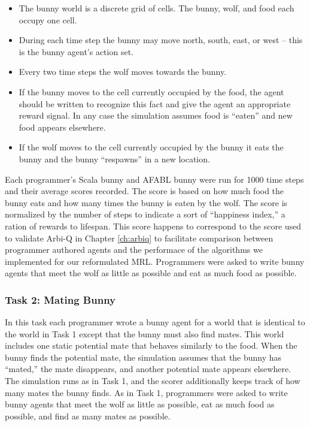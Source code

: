 \begin{itemize}

\item The bunny world is a discrete grid of cells.  The bunny, wolf, and food each occupy one cell.

\item During each time step the bunny may move north, south, east, or west -- this is the bunny agent's action set.

\item Every two time steps the wolf moves towards the bunny.

\item If the bunny moves to the cell currently occupied by the food, the agent should be written to recognize this fact and give the agent an appropriate reward signal. In any case the simulation assumes food is ``eaten'' and new food appears elsewhere.

\item If the wolf moves to the cell currently occupied by the bunny it eats the bunny and the bunny ``respawns'' in a new location.

\end{itemize}

Each programmer's Scala bunny and AFABL bunny were run for 1000 time steps and their average scores recorded. The score is based on how much food the bunny eats and how many times the bunny is eaten by the wolf. The score is normalized by the number of steps to indicate a sort of ``happiness index,'' a ration of rewards to lifespan. This score happens to correspond to the score used to validate Arbi-Q in Chapter \ref{ch:arbiq} to facilitate comparison between programmer authored agents and the performace of the algorithms we implemented for our reformulated MRL. Programmers were asked to write bunny agents that meet the wolf as little as possible and eat as much food as possible.

\subsubsection{Task 2: Mating Bunny}\label{sec:task2}

In this task each programmer wrote a bunny agent for a world that is identical to the world in Task 1 except that the bunny must also find mates.  This world includes one static  potential mate that behaves similarly to the food.  When the bunny finds the potential mate, the simulation assumes that the bunny has ``mated,'' the mate disappears, and another potential mate appears elsewhere.  The simulation runs as in Task 1, and the scorer additionally keeps track of how many mates the bunny finds.  As in Task 1, programmers were asked to write bunny agents that meet the wolf as little as possible, eat as much food as possible, and find as many mates as possible.

